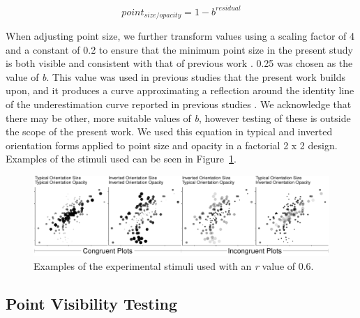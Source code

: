 \documentclass[manuscript, review, anonymous, screen]{acmart}
\begin{document}
\begin{equation}
  point_{size/opacity} = 1 - b^{residual}
\end{equation}

When adjusting point size, we further transform values using a scaling
factor of 4 and a constant of 0.2 to ensure that the minimum point size
in the present study is both visible and consistent with that of
previous work \citep{strain_2023, strain_2023b}. 0.25 was chosen as the
value of \emph{b}. This value was used in previous studies that the
present work builds upon, and it produces a curve approximating a
reflection around the identity line of the underestimation curve
reported in previous studies
\citep{rensink_2017, strain_2023, strain_2023b}. We acknowledge that
there may be other, more suitable values of \emph{b}, however testing of
these is outside the scope of the present work. We used this equation in
typical and inverted orientation forms applied to point size and opacity
in a factorial 2 x 2 design. Examples of the stimuli used can be seen in
Figure~\ref{fig-examples}.

\begin{figure}

\includegraphics[width=1\textwidth,height=\textheight]{size_and_opacity_files/figure-pdf/fig-examples-1.pdf} \hfill{}

\caption{\label{fig-examples}Examples of the experimental stimuli used
with an \textit{r} value of 0.6.}

\end{figure}

\hypertarget{sec-VT}{%
\subsection{Point Visibility Testing}\label{sec-VT}}
\end{document}
